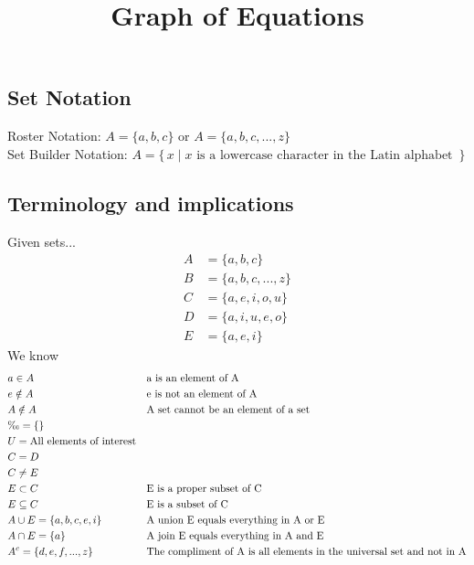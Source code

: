 \documentclass[]{article}
\title{\vspace{-5ex}Graph of Equations \vspace{-5ex}}
\author{}
\date{}
\begin{document}
	\maketitle{}
	
	\subsection*{}
	
	\subsection*{Set Notation}
	Roster Notation: $ A = \{ a, b, c \} $ or $ A = \{ a, b, c, ..., z \} $ \\
	Set Builder Notation: $ A = \{\,x \mid x \text{ is a lowercase character in the Latin alphabet }\,\}$
	
	\subsection*{Terminology and implications}
	Given sets...
	\begin{align*}
		A &= \{ a, b, c \} \\
		B &= \{ a, b, c, ..., z \} \\
		C &= \{ a, e, i, o, u \} \\
		D &= \{ a, i, u, e, o \} \\
		E &= \{ a, e, i \}
	\end{align*}
	We know
	\begin{align*}
		& a \in A              & &\text{a is an element of A} \\
		& e \notin A        & &\text{e is not an element of A} \\
		& A \notin A        & &\text{A set cannot be an element of a set} \\
		& \O = \{ \}           & & \\
		& U = \text{All elements of interest} & & \\
		& C = D               && \\
		& C \neq E          & & \\
		& E \subset C     & &\text{E is a proper subset of C} \\
		& E \subseteq C & &\text{E is a subset of C} \\
		& A \cup E = \{ a, b, c, e, i \} & &\text{A union E equals everything in A or E} \\
		& A \cap E = \{ a \} & &\text{A join E equals everything in A and E} \\
		& A^c = \{ d, e, f, ..., z \} & &\text{The compliment of A is all elements in the universal set and not in A}
	\end{align*}
	
\end{document}
